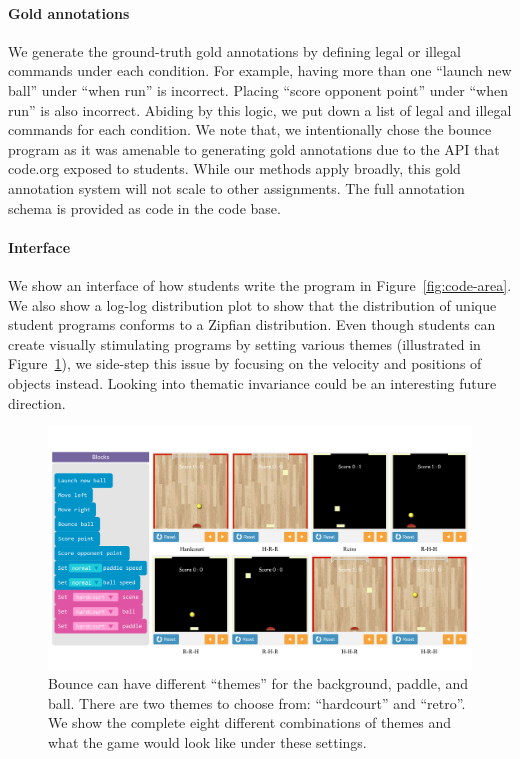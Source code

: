 \documentclass{article}
\begin{document}
\paragraph{Gold annotations} 
We generate the ground-truth gold annotations by defining legal or illegal commands under each condition. For example, having more than one ``launch new ball'' under ``when run'' is incorrect. Placing ``score opponent point'' under ``when run'' is also incorrect. Abiding by this logic, we put down a list of legal and illegal commands for each condition.  We note that, we intentionally chose the bounce program as it was amenable to generating gold annotations due to the API that code.org exposed to students. While our methods apply broadly, this gold annotation system will not scale to other assignments. The full annotation schema is provided as code in the code base.

\paragraph{Interface}

We show an interface of how students write the program in Figure~\ref{fig:code-area}. We also show a log-log distribution plot to show that the distribution of unique student programs conforms to a Zipfian distribution. Even though students can create visually stimulating programs by setting various themes (illustrated in Figure~\ref{fig:theme-invars}), we side-step this issue by focusing on the velocity and positions of objects instead. Looking into thematic invariance could be an interesting future direction.

\begin{figure}[ht]
  \centering
  \includegraphics[width=0.85\linewidth]{images/thematic-invariance-new.pdf}
  \caption{Bounce can have different ``themes'' for the background, paddle, and ball. There are two themes to choose from: ``hardcourt'' and ``retro''. We show the complete eight different combinations of themes and what the game would look like under these settings.}
  \label{fig:theme-invars}
\end{figure}
\end{document}
